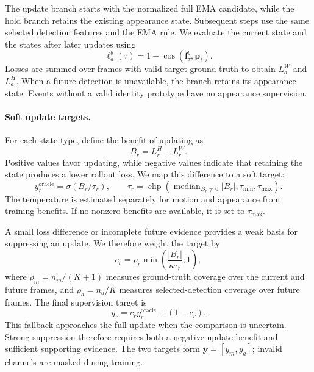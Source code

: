 \documentclass[a4paper,fleqn]{cas-sc}
\begin{document}
The update branch starts with the normalized full EMA candidate, while the hold branch retains the existing appearance state. Subsequent steps use the same selected detection features and the EMA rule. We evaluate the current state and the states after later updates using
\begin{equation}
\ell_a^b(\tau)=1-\cos(\bm{f}_\tau^b,\bm{p}_i).
\label{eq:appearance_loss}
\end{equation}
Losses are summed over frames with valid target ground truth to obtain $L_a^W$ and $L_a^H$. When a future detection is unavailable, the branch retains its appearance state. Events without a valid identity prototype have no appearance supervision.

\paragraph{Soft update targets.}
For each state type, define the benefit of updating as
\begin{equation}
B_r=L_r^H-L_r^W.
\label{eq:benefit}
\end{equation}
Positive values favor updating, while negative values indicate that retaining the state produces a lower rollout loss. We map this difference to a soft target:
\begin{equation}
y_r^{\mathrm{oracle}}=\sigma(B_r/\tau_r),\qquad
\tau_r=\operatorname{clip}\!\left(
\operatorname{median}_{B_r\ne0}|B_r|,\tau_{\min},\tau_{\max}
\right).
\label{eq:oracle_soft}
\end{equation}
The temperature is estimated separately for motion and appearance from training benefits. If no nonzero benefits are available, it is set to $\tau_{\max}$.

A small loss difference or incomplete future evidence provides a weak basis for suppressing an update. We therefore weight the target by
\begin{equation}
c_r=\rho_r\min\!\left(\frac{|B_r|}{\kappa\tau_r},1\right),
\label{eq:label_confidence}
\end{equation}
where $\rho_m=n_m/(K+1)$ measures ground-truth coverage over the current and future frames, and $\rho_a=n_a/K$ measures selected-detection coverage over future frames. The final supervision target is
\begin{equation}
y_r=c_r y_r^{\mathrm{oracle}}+(1-c_r).
\label{eq:safe_target}
\end{equation}
This fallback approaches the full update when the comparison is uncertain. Strong suppression therefore requires both a negative update benefit and sufficient supporting evidence. The two targets form $\bm{y}=[y_m,y_a]$; invalid channels are masked during training.
\end{document}
